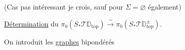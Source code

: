 (Cas pas intéressant je crois, sauf pour $\Sigma=\varnothing$ également)


 \uline{Détermination} du $\pi_0(S_{*}\mathscr T\mathbb D_{\mathrm{top}})\xrightarrow{\sim}\pi_0(S_{*}\mathscr T\mathbb D_{\mathrm{top}}^{\pm})$.

On introduit les \uline{graphes}  bipondérés

